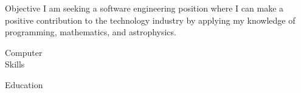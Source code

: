 \documentclass{myresume}
\begin{document}
  \ResumeHeader

  \begin{resumesection}{Objective}
    I am seeking a software engineering position where I can make a positive
    contribution to the technology industry by applying my knowledge of
    programming, mathematics, and astrophysics.
  \end{resumesection}

  \begin{resumesection}{Computer \\ Skills}
  \end{resumesection}

  \begin{resumesection}{Education}
  \end{resumesection}
\end{document}
